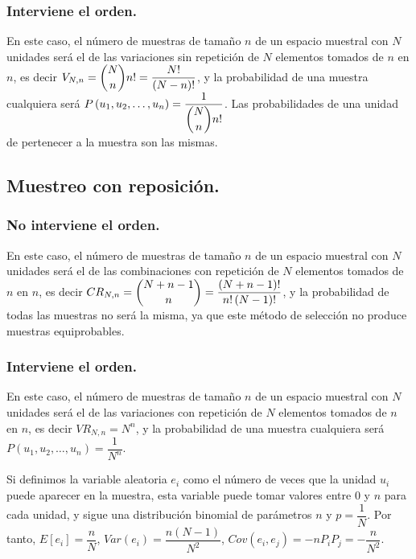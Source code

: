 \subsubsection{Interviene el orden.}

En este caso, el n\'umero de muestras de tama\~no $n$ de un espacio muestral
con $N$ unidades ser\'a el de las variaciones sin repetici\'on de $N$
elementos tomados de $n$ en $n$, es decir $V_{N,n}=\dbinom{N}{n}n!=\dfrac{N!}{\left(N-n\right)!}$,
y la probabilidad de una muestra cualquiera ser\'a $P\left(u_{1},u_{2},\ldots,u_{n}\right)=\dfrac{1}{\dbinom{N}{n}n!}$.
Las probabilidades de una unidad de pertenecer a la muestra son las
mismas.


\subsection{Muestreo con reposici\'on.}


\subsubsection{No interviene el orden.}

En este caso, el n\'umero de muestras de tama\~no $n$ de un espacio muestral
con $N$ unidades ser\'a el de las combinaciones con repetici\'on de $N$
elementos tomados de $n$ en $n$, es decir $CR_{N,n}=\dbinom{N+n-1}{n}=\dfrac{\left(N+n-1\right)!}{n!\left(N-1\right)!}$,
y la probabilidad de todas las muestras no ser\'a la misma, ya que este
m\'etodo de selecci\'on no produce muestras equiprobables.


\subsubsection{Interviene el orden.}

En este caso, el n\'umero de muestras de tama\~no $n$ de un espacio muestral
con $N$ unidades ser\'a el de las variaciones con repetici\'on de $N$
elementos tomados de $n$ en $n$, es decir $VR_{N,n}=N^{n}$, y la
probabilidad de una muestra cualquiera ser\'a $P\left(u_{1},u_{2},\ldots,u_{n}\right)=\dfrac{1}{N^{n}}$.

Si definimos la variable aleatoria $e_{i}$ como el n\'umero de veces
que la unidad $u_{i}$ puede aparecer en la muestra, esta variable
puede tomar valores entre $0$ y $n$ para cada unidad, y sigue una
distribuci\'on binomial de par\'ametros $n$ y $p=\dfrac{1}{N}$. Por
tanto, $E\left[e_{i}\right]=\dfrac{n}{N}$, $Var\left(e_{i}\right)=\dfrac{n\left(N-1\right)}{N^{2}}$,
$Cov\left(e_{i},e_{j}\right)=-nP_{i}P_{j}=-\dfrac{n}{N^{2}}$.


